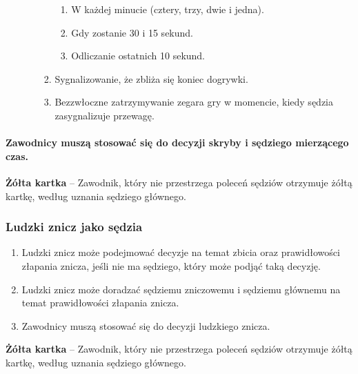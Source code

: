 \documentclass[12pt]{article}
\newcommand\yellowcard[1]{\bgroup\textcolor{darkyellow}{\textbf{#1}}}
\begin{document}
\begin{enumerate}
\begin{enumerate}
\begin{enumerate}
			                  \begin{enumerate}
				                  \item
				                        W każdej minucie (cztery, trzy, dwie i jedna).
				                  \item
				                        Gdy zostanie 30 i 15 sekund.
				                  \item
				                        Odliczanie ostatnich 10 sekund.
			                  \end{enumerate}
			            \item
			                  Sygnalizowanie, że zbliża się koniec dogrywki.
			            \item
			                  Bezzwłoczne zatrzymywanie zegara gry w momencie, kiedy sędzia
			                  zasygnalizuje przewagę.
		            \end{enumerate}
	      \end{enumerate}
\end{enumerate}

\paragraph{Zawodnicy muszą stosować się do decyzji skryby i
	sędziego mierzącego czas.}

\yellowcard{Żółta kartka} -- Zawodnik, który nie przestrzega poleceń sędziów
otrzymuje żółtą kartkę, według uznania sędziego głównego.

\subsubsection{Ludzki znicz jako sędzia}

\begin{enumerate}
	\item Ludzki znicz może podejmować decyzje na temat zbicia oraz
	      prawidłowości złapania znicza, jeśli nie ma sędziego, który może podjąć
	      taką decyzję.

	\item Ludzki znicz może doradzać sędziemu zniczowemu i sędziemu głównemu na
	      temat prawidłowości złapania znicza.

	\item Zawodnicy muszą stosować się do decyzji ludzkiego znicza.
\end{enumerate}

\yellowcard{Żółta kartka} -- Zawodnik, który nie przestrzega poleceń sędziów
otrzymuje żółtą kartkę, według uznania sędziego głównego.
\end{document}
